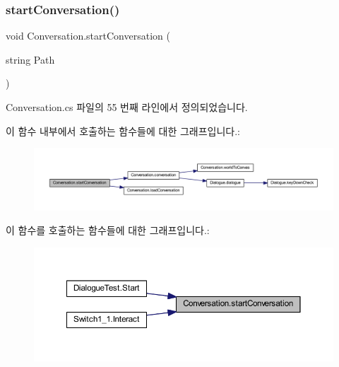 \subsubsection{\texorpdfstring{startConversation()}{startConversation()}}
{\footnotesize\ttfamily void Conversation.\+start\+Conversation (\begin{DoxyParamCaption}\item[{string}]{Path }\end{DoxyParamCaption})}



Conversation.\+cs 파일의 55 번째 라인에서 정의되었습니다.


\begin{DoxyCode}{0}

\end{DoxyCode}
이 함수 내부에서 호출하는 함수들에 대한 그래프입니다.\+:\nopagebreak
\begin{figure}[H]
\begin{center}
\leavevmode
\includegraphics[width=350pt]{d2/d94/class_conversation_a3822a8973deb8b3bcf00bbca652f5989_cgraph}
\end{center}
\end{figure}
이 함수를 호출하는 함수들에 대한 그래프입니다.\+:\nopagebreak
\begin{figure}[H]
\begin{center}
\leavevmode
\includegraphics[width=350pt]{d2/d94/class_conversation_a3822a8973deb8b3bcf00bbca652f5989_icgraph}
\end{center}
\end{figure}
\mbox{\label{class_conversation_aaf0ecb8e30c248e7f8bf29cc7fe14678}} 
